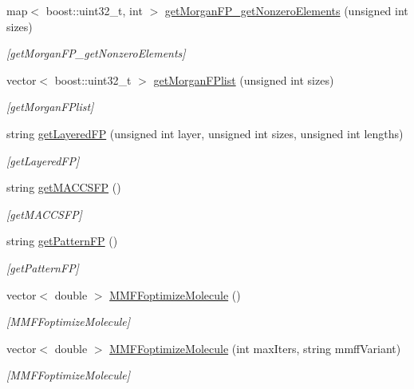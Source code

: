 \begin{DoxyCompactItemize}
map$<$ boost\+::uint32\+\_\+t, int $>$ \hyperlink{class_molecule_aa769820db6167c0861d1a784ba64ebbc}{get\+Morgan\+F\+P\+\_\+get\+Nonzero\+Elements} (unsigned int sizes)
\begin{DoxyCompactList}\small\item\em \mbox{[}get\+Morgan\+F\+P\+\_\+get\+Nonzero\+Elements\mbox{]} \end{DoxyCompactList}\item 
vector$<$ boost\+::uint32\+\_\+t $>$ \hyperlink{class_molecule_a8546f6429ed2147b33c9d61fc192513c}{get\+Morgan\+F\+Plist} (unsigned int sizes)
\begin{DoxyCompactList}\small\item\em \mbox{[}get\+Morgan\+F\+Plist\mbox{]} \end{DoxyCompactList}\item 
string \hyperlink{class_molecule_a63f6ddc4735f6b2464745ff3ffac724e}{get\+Layered\+F\+P} (unsigned int layer, unsigned int sizes, unsigned int lengths)
\begin{DoxyCompactList}\small\item\em \mbox{[}get\+Layered\+F\+P\mbox{]} \end{DoxyCompactList}\item 
string \hyperlink{class_molecule_ab883bbe83bb687a47fe8259dab882db1}{get\+M\+A\+C\+C\+S\+F\+P} ()
\begin{DoxyCompactList}\small\item\em \mbox{[}get\+M\+A\+C\+C\+S\+F\+P\mbox{]} \end{DoxyCompactList}\item 
string \hyperlink{class_molecule_a7f662f6ba9e4d12024ff242042df65be}{get\+Pattern\+F\+P} ()
\begin{DoxyCompactList}\small\item\em \mbox{[}get\+Pattern\+F\+P\mbox{]} \end{DoxyCompactList}\item 
vector$<$ double $>$ \hyperlink{class_molecule_a5e441ebbeef50a379ed79911805a5124}{M\+M\+F\+Foptimize\+Molecule} ()
\begin{DoxyCompactList}\small\item\em \mbox{[}M\+M\+F\+Foptimize\+Molecule\mbox{]} \end{DoxyCompactList}\item 
vector$<$ double $>$ \hyperlink{class_molecule_a871ec0fe06c07a873ef29d1af4190640}{M\+M\+F\+Foptimize\+Molecule} (int max\+Iters, string mmff\+Variant)
\begin{DoxyCompactList}\small\item\em \mbox{[}M\+M\+F\+Foptimize\+Molecule\mbox{]} \end{DoxyCompactList}\item 

\end{DoxyCompactItemize}
